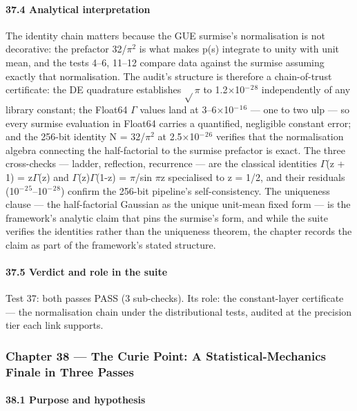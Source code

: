 \documentclass[10pt]{article}
\begin{document}
\paragraph{37.4 Analytical interpretation}

The identity chain matters because the GUE surmise's normalisation is not decorative: the prefactor 32/$\pi$$^2$ is what makes p(s) integrate to unity with unit mean, and the tests 4--6, 11--12 compare data against the surmise assuming exactly that normalisation. The audit's structure is therefore a chain-of-trust certificate: the DE quadrature establishes $\sqrt{}$$\pi$ to 1.2$\times$10$^-$$^2$$^8$ independently of any library constant; the Float64 $\Gamma$ values land at 3--6$\times$10$^-$$^1$$^6$ --- one to two ulp --- so every surmise evaluation in Float64 carries a quantified, negligible constant error; and the 256-bit identity N = 32/$\pi$$^2$ at 2.5$\times$10$^-$$^2$$^6$ verifies that the normalisation algebra connecting the half-factorial to the surmise prefactor is exact. The three cross-checks --- ladder, reflection, recurrence --- are the classical identities $\Gamma$(z + 1) = z$\Gamma$(z) and $\Gamma$(z)$\Gamma$(1-z) = $\pi$/sin $\pi$z specialised to z = 1/2, and their residuals (10$^-$$^2$$^5$--10$^-$$^2$$^8$) confirm the 256-bit pipeline's self-consistency. The uniqueness clause --- the half-factorial Gaussian as the unique unit-mean fixed form --- is the framework's analytic claim that pins the surmise's form, and while the suite verifies the identities rather than the uniqueness theorem, the chapter records the claim as part of the framework's stated structure.

\paragraph{37.5 Verdict and role in the suite}

Test 37: both passes PASS (3 sub-checks). Its role: the constant-layer certificate --- the normalisation chain under the distributional tests, audited at the precision tier each link supports.

\subsubsection{Chapter 38 --- The Curie Point: A Statistical-Mechanics Finale in Three Passes}

\paragraph{38.1 Purpose and hypothesis}
\end{document}
